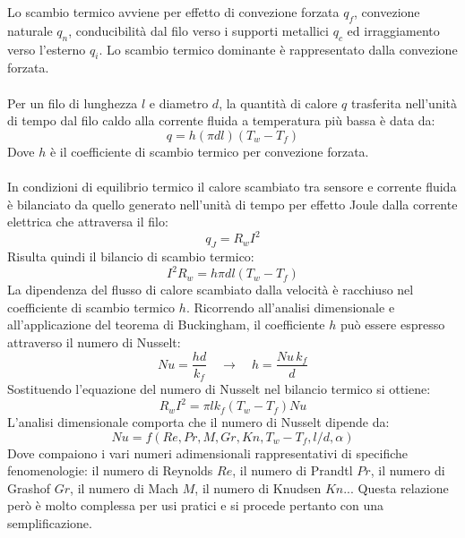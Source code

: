 Lo scambio termico avviene per effetto di convezione forzata $q_f$, convezione naturale $q_n$, conducibilità dal filo verso i supporti metallici $q_c$ ed irraggiamento verso l'esterno $q_i$. Lo scambio termico dominante è rappresentato dalla convezione forzata.\\\\
Per un filo di lunghezza $l$ e diametro $d$, la quantità di calore $q$ trasferita nell'unità di tempo dal filo caldo alla corrente fluida a temperatura più bassa è data da:
\begin{equation*}
    q = h(\pi d l) (T_w - T_f)
\end{equation*}
Dove $h$ è il coefficiente di scambio termico per convezione forzata.\\\\
In condizioni di equilibrio termico il calore scambiato tra sensore e corrente fluida è bilanciato da quello generato nell'unità di tempo per effetto Joule dalla corrente elettrica che attraversa il filo:
\begin{equation*}
    q_J = R_w I^2
\end{equation*}
Risulta quindi il bilancio di scambio termico:
\begin{equation*}
    I^2R_w = h\pi d l (T_w - T_f)
\end{equation*}
La dipendenza del flusso di calore scambiato dalla velocità è racchiuso nel coefficiente di scambio termico $h$. Ricorrendo all'analisi dimensionale e all'applicazione del teorema di Buckingham, il coefficiente $h$ può essere espresso attraverso il numero di Nusselt:
\begin{equation*}
    Nu = \frac{ h d}{k_f} \quad \rightarrow \quad h = \frac{Nu\, k_f}d
\end{equation*}
Sostituendo l'equazione del numero di Nusselt nel bilancio termico si ottiene:
\begin{equation*}
    R_w I^2 = \pi l k_f (T_w - T_f) Nu
\end{equation*}
L'analisi dimensionale comporta che il numero di Nusselt dipende da:
\begin{equation*}
    Nu = f(Re, Pr, M, Gr, Kn, T_w-T_f, l/d, \alpha)
\end{equation*}
Dove compaiono i vari numeri adimensionali rappresentativi di specifiche fenomenologie: il numero di Reynolds $Re$, il numero di Prandtl $Pr$, il numero di Grashof $Gr$, il numero di Mach $M$, il numero di Knudsen $Kn$... Questa relazione però è molto complessa per usi pratici e si procede pertanto con una semplificazione.\\\\
